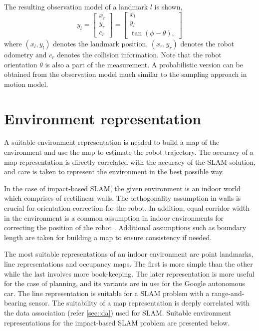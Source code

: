 The resulting observation model of a landmark $l$ is shown,
\begin{equation*}
y_l = \begin{bmatrix}x_r \\ y_r \\ c_r\end{bmatrix} = \begin{bmatrix}
x_l \\ y_l \\ \tan(\phi-\theta),
\end{bmatrix}
\end{equation*}
where $(x_l,y_l)$ denotes the landmark position, $(x_r,y_r)$ denotes the robot odometry and $c_r$ denotes the collision information. Note that the robot orientation $\theta$ is also a part of the measurement. A probabilistic version can be obtained from the observation model much similar to the sampling approach in motion model.
 
\section{Environment representation} \label{sec::env_rep}
A suitable environment representation is needed to build a map of the environment and use the map to estimate the robot trajectory. The accuracy of a map representation is directly correlated with the accuracy of the SLAM solution, and care is taken to represent the environment in the best possible way. 

In the case of impact-based SLAM, the given environment is an indoor world which comprises of rectilinear walls. The orthogonality assumption in walls is crucial for orientation correction for the robot. In addition, equal corridor width in the environment is a common assumption in indoor environments for correcting the position of the robot \cite{jensfelt2001approaches}. Additional assumptions such as boundary length are taken for building a map to ensure consistency if needed. 

The most suitable representations of an indoor environment are point landmarks, line representations and occupancy maps. The first is more simple than the other while the last involves more book-keeping. The later representation is more useful for the case of planning, and its variants are in use for the Google autonomous car. The line representation is suitable for a SLAM problem with a range-and-bearing sensor. The suitability of a map representation is deeply correlated with the data association (refer \ref{sec::da}) used for SLAM. Suitable environment representations for the impact-based SLAM problem are presented below.

